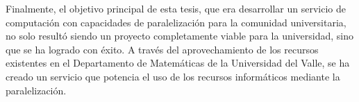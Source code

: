 \begin{spacing}{1.5}
Finalmente, el objetivo principal de esta tesis, que era desarrollar un servicio de computación con capacidades de paralelización para la comunidad universitaria, no solo resultó siendo un proyecto completamente viable para la universidad, sino que se ha logrado con éxito. A través del aprovechamiento de los recursos existentes en el Departamento de Matemáticas de la Universidad del Valle, se ha creado un servicio que potencia el uso de los recursos informáticos mediante la paralelización.

  \mylinespacing
  \mylinespacing
  \begin{tightcenter}
  \end{tightcenter}
\end{spacing}